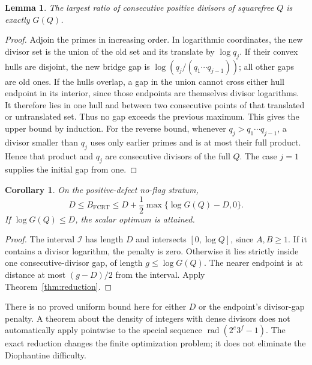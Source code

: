 \documentclass[11pt]{article}
\newtheorem{lemma}[theorem]{Lemma}
\newtheorem{corollary}[theorem]{Corollary}
\theoremstyle{definition}\newtheorem{definition}[theorem]{Definition}
\theoremstyle{remark}\newtheorem{remark}[theorem]{Remark}
\newcommand{\rad}{\operatorname{rad}}
\newcommand{\FCRT}{\mathrm{FCRT}}
\begin{document}
\begin{lemma}\label{lem:dense}
The largest ratio of consecutive positive divisors of squarefree \(Q\)
is exactly \(G(Q)\).
\end{lemma}
\begin{proof}
Adjoin the primes in increasing order. In logarithmic coordinates, the new
divisor set is the union of the old set and its translate by \(\log q_j\).
If their convex hulls are disjoint, the new bridge gap is
\(\log(q_j/(q_1\cdots q_{j-1}))\); all other gaps are old ones. If the
hulls overlap, a gap in the union cannot cross either hull endpoint in its
interior, since those endpoints are themselves divisor logarithms. It therefore
lies in one hull and between two consecutive points of that translated or
untranslated set. Thus no gap exceeds the previous maximum.
This gives the upper bound by induction.
For the reverse bound, whenever \(q_j>q_1\cdots q_{j-1}\), a divisor
smaller than \(q_j\) uses only earlier primes and is at most their full
product. Hence that product and \(q_j\) are consecutive divisors of the
full \(Q\). The case \(j=1\) supplies the initial gap from one.
\end{proof}

\begin{corollary}\label{cor:densebound}
On the positive-defect no-flag stratum,
\[
 D\le B_{\FCRT}\le D+\frac12\max\{\log G(Q)-D,0\}.
\]
If \(\log G(Q)\le D\), the scalar optimum is attained.
\end{corollary}
\begin{proof}
The interval \(\mathcal I\) has length \(D\) and intersects
\([0,\log Q]\), since \(A,B\ge1\). If it contains a divisor logarithm,
the penalty is zero. Otherwise it lies strictly inside one consecutive-divisor
gap, of length \(g\le\log G(Q)\). The nearer endpoint is at distance at
most \((g-D)/2\) from the interval. Apply Theorem~\ref{thm:reduction}.
\end{proof}

There is no proved uniform bound here for either \(D\) or the endpoint's
divisor-gap penalty. A theorem about the density of integers with dense
divisors does not automatically apply pointwise to the special sequence
\(\rad(2^e3^f-1)\). The exact reduction changes the finite optimization
problem; it does not eliminate the Diophantine difficulty.
\end{document}
